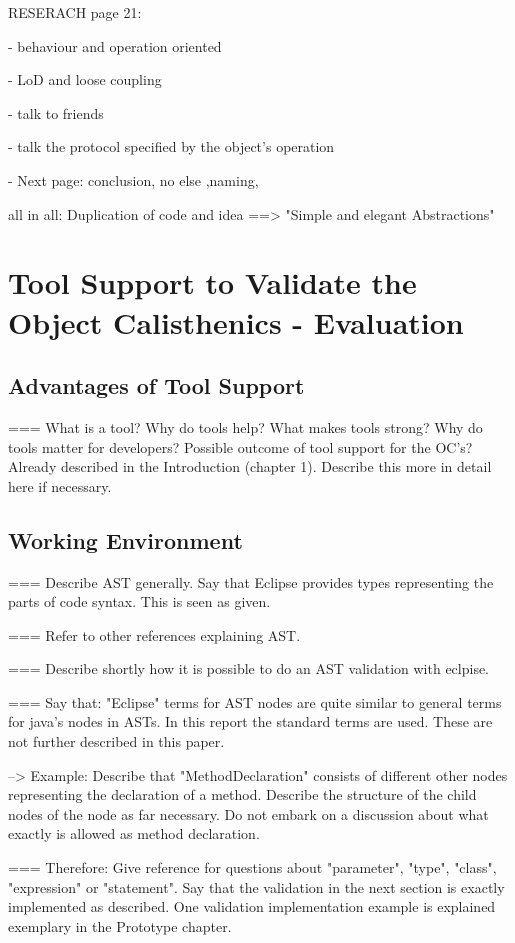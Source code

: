 RESERACH page 21: 

- behaviour and operation oriented

- LoD and loose coupling

- talk to friends

- talk the protocol specified by the object's operation

- Next page: conclusion, no else ,naming, 

all in all: Duplication of code and idea
==> "Simple and elegant Abstractions"


\chapter{Tool Support to Validate the Object Calisthenics - Evaluation}
\label{Evaluation}
\section{Advantages of Tool Support}
\label{e:advantages}
=== What is a tool? Why do tools help? What makes tools strong? Why do tools matter for developers?
Possible outcome of tool support for the OC's? Already described in the Introduction (chapter 1). Describe this more in detail here if necessary. 
\section{Working Environment}
=== Describe AST generally. Say that Eclipse provides types representing the parts of code syntax. This is seen as given. 

=== Refer to other references explaining AST.

=== Describe shortly how it is possible to do an AST validation with eclpise. 

=== Say that: "Eclipse" terms for AST nodes are quite similar to general terms for java's nodes in ASTs. In this report the standard terms are used. These are not further described in this paper.

--> Example: Describe that "MethodDeclaration" consists of different other nodes representing the declaration of a method. Describe the structure of the child nodes of the node as far necessary. Do not embark on a discussion about what exactly is allowed as method declaration. 

=== Therefore: Give reference for questions about "parameter", "type", "class", "expression" or "statement".
Say that the validation in the next section is exactly implemented as described. One validation implementation example is explained exemplary in the Prototype chapter.

